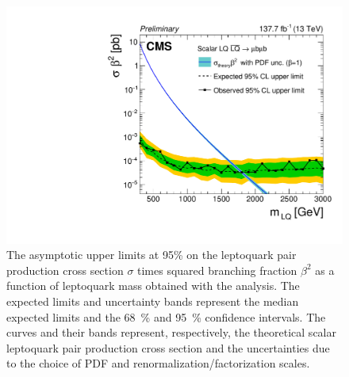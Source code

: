 \begin{figure}[H]
  \centering
  \includegraphics[width=\textwidth]{Images/Analysis/Limits/BR_Sigma_MuMu_Combined.pdf}
  \caption{The asymptotic upper limits at \num{95}{\%} \CL on the leptoquark pair production cross section $\sigma$ times squared branching fraction $\beta^2$ as a function of leptoquark mass obtained with the \mumubj analysis. The expected limits and uncertainty bands represent the median expected limits and the \SI{68}{\%} and \SI{95}{\%} confidence intervals. The \xsecTheory curves and their bands represent, respectively, the theoretical scalar leptoquark pair production cross section and the uncertainties due to the choice of PDF and renormalization/factorization scales.}
  \label{fig:limit_plot_combined}
\end{figure}